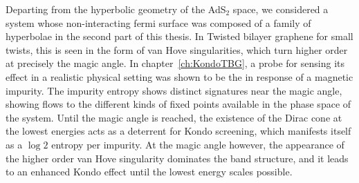 \par
Departing from the hyperbolic geometry of the AdS${}_2$ space, we considered a system whose non-interacting fermi surface was composed of a family of hyperbolae in the second part of this thesis. In Twisted bilayer graphene for small twists, this is seen in the form of van Hove singularities, which turn higher order at precisely the magic angle. In chapter~\ref{ch:KondoTBG}, a probe for sensing its effect in a realistic physical setting was shown to be the in response of a magnetic impurity. The impurity entropy shows distinct signatures near the magic angle, showing flows to the different kinds of fixed points available in the phase space of the system. Until the magic angle is reached, the existence of the Dirac cone at the lowest energies acts as a deterrent for Kondo screening, which manifests itself as a $\log 2$ entropy per impurity. At the magic angle however, the appearance of the higher order van Hove singularity dominates the band structure, and it leads to an enhanced Kondo effect until the lowest energy scales possible.


\newpage
\thispagestyle{empty}